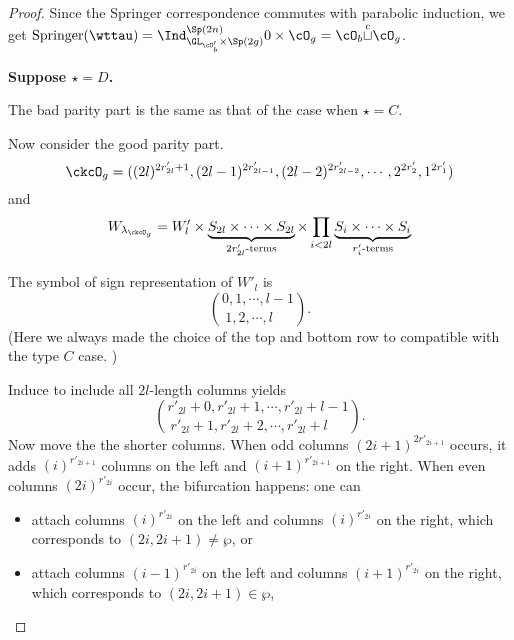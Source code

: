 \documentclass[12pt,a4paper]{amsart}
\numberwithin{equation}{section}
\theoremstyle{remark}
\def\lamckg{\lambda_{\ckcO_g}}
\def\cupcol{{\stackrel{c}{\sqcup}}}
\def\Spr{\mathrm{Springer}}
\def\sP{\wp}
\begin{document}
\begin{proof}
{  Since the Springer correspondence commutes with parabolic induction, we get
  $\Spr(\wttau) = \Ind_{\GL_{\cO'_{b}}\times \Sp(2g)}^{\Sp(2n)} 0\times \cO_{g} = \cO_{b}\cupcol \cO_{g}$.


  \medskip

  {\bf Suppose $\star=D$.}

  The bad parity part is the same as that of the case when $\star = C$.

  Now consider the good parity part.
  \[
    \ckcO_{g} = ((2l)^{2r'_{2l}+1}, (2l-1)^{2r'_{2l-1}}, (2l-2)^{2r'_{2l-2}},
    \cdots, 2^{2r'_{2}}, 1^{2r'_{1}}  )
  \]
  and
  \[
    W_{\lamckg} = W'_{l}\times
    \underbrace{S_{2l}\times \cdots \times S_{2l}}_{2r'_{2l}\text{-terms}}
    \times \prod_{i<2l}
    \underbrace{S_{i}\times \cdots\times S_{i}}_{r'_{i}\text{-terms}}
  \]

  The symbol of sign representation of $W'_{l}$ is
  \[
    \binom{0,1, \cdots, l-1}{1,2, \cdots, l\phantom{-1}}.
  \]
  (Here we always made the choice of the top and bottom row to compatible with the
  type $C$ case. )

  Induce to include all $2l$-length columns yields
  \[
    \binom{r'_{2l}+0,r'_{2l}+1, \cdots, r'_{2l}+l-1}{
      r'_{2l}+1,r'_{2l}+2, \cdots, r'_{2l}+l\phantom{-1}}.
  \]
  Now move the the shorter columns. When odd columns
  $(2i+1)^{2r'_{2i+1}}$ occurs, it adds $(i)^{r'_{2i+1}}$ columns on the left
  and $(i+1)^{r'_{2i+1}}$ on the right.
  When even columns $(2i)^{r'_{2i}}$ occur,  the bifurcation
  happens: one can
  \begin{itemize}
    \item attach columns $(i)^{r'_{2i}}$ on the left and
    columns $(i)^{r'_{2i}}$ on the right, which corresponds to
    $(2i,2i+1)\neq \sP$, or
    \item
    attach columns $(i-1)^{r'_{2i}}$ on the left and
    columns $(i+1)^{r'_{2i}}$ on the right, which corresponds to
    $(2i,2i+
    1)\in \sP$,
  \end{itemize}

}
\end{proof}
\end{document}
